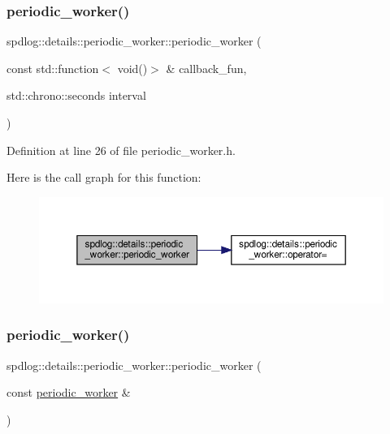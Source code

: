 \subsubsection{\texorpdfstring{periodic\+\_\+worker()}{periodic\_worker()}\hspace{0.1cm}{\footnotesize\ttfamily [1/2]}}
{\footnotesize\ttfamily spdlog\+::details\+::periodic\+\_\+worker\+::periodic\+\_\+worker (\begin{DoxyParamCaption}\item[{const std\+::function$<$ void()$>$ \&}]{callback\+\_\+fun,  }\item[{std\+::chrono\+::seconds}]{interval }\end{DoxyParamCaption})\hspace{0.3cm}{\ttfamily [inline]}}



Definition at line 26 of file periodic\+\_\+worker.\+h.

Here is the call graph for this function\+:
\nopagebreak
\begin{figure}[H]
\begin{center}
\leavevmode
\includegraphics[width=350pt]{classspdlog_1_1details_1_1periodic__worker_a16ae1b1cb27aa85efbc25a2f055d3523_cgraph}
\end{center}
\end{figure}
\mbox{\label{classspdlog_1_1details_1_1periodic__worker_a43b4294bd9a547727864ff18da48b775}} 
\subsubsection{\texorpdfstring{periodic\+\_\+worker()}{periodic\_worker()}\hspace{0.1cm}{\footnotesize\ttfamily [2/2]}}
{\footnotesize\ttfamily spdlog\+::details\+::periodic\+\_\+worker\+::periodic\+\_\+worker (\begin{DoxyParamCaption}\item[{const \hyperlink{classspdlog_1_1details_1_1periodic__worker}{periodic\+\_\+worker} \&}]{ }\end{DoxyParamCaption})\hspace{0.3cm}{\ttfamily [delete]}}

